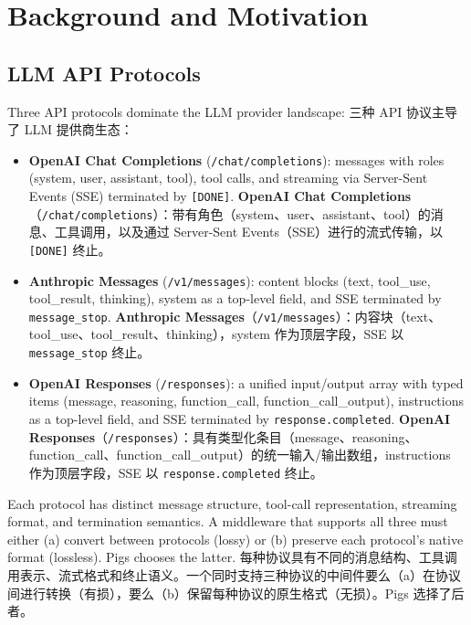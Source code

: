 \section{Background and Motivation}
\label{sec:bg}

\subsection{LLM API Protocols}

Three API protocols dominate the LLM provider landscape:
三种 API 协议主导了 LLM 提供商生态：

\begin{itemize}[nosep]
    \item \textbf{OpenAI Chat Completions} (\texttt{/chat/completions}): messages with roles (system, user, assistant, tool), tool calls, and streaming via Server-Sent Events (SSE) terminated by \texttt{[DONE]}.
    \textbf{OpenAI Chat Completions}（\texttt{/chat/completions}）：带有角色（system、user、assistant、tool）的消息、工具调用，以及通过 Server-Sent Events（SSE）进行的流式传输，以 \texttt{[DONE]} 终止。
    \item \textbf{Anthropic Messages} (\texttt{/v1/messages}): content blocks (text, tool\_use, tool\_result, thinking), system as a top-level field, and SSE terminated by \texttt{message\_stop}.
    \textbf{Anthropic Messages}（\texttt{/v1/messages}）：内容块（text、tool\_use、tool\_result、thinking），system 作为顶层字段，SSE 以 \texttt{message\_stop} 终止。
    \item \textbf{OpenAI Responses} (\texttt{/responses}): a unified input/output array with typed items (message, reasoning, function\_call, function\_call\_output), instructions as a top-level field, and SSE terminated by \texttt{response.completed}.
    \textbf{OpenAI Responses}（\texttt{/responses}）：具有类型化条目（message、reasoning、function\_call、function\_call\_output）的统一输入/输出数组，instructions 作为顶层字段，SSE 以 \texttt{response.completed} 终止。
\end{itemize}

Each protocol has distinct message structure, tool-call representation, streaming format, and termination semantics. A middleware that supports all three must either (a) convert between protocols (lossy) or (b) preserve each protocol's native format (lossless). Pigs chooses the latter.
每种协议具有不同的消息结构、工具调用表示、流式格式和终止语义。一个同时支持三种协议的中间件要么（a）在协议间进行转换（有损），要么（b）保留每种协议的原生格式（无损）。Pigs 选择了后者。

